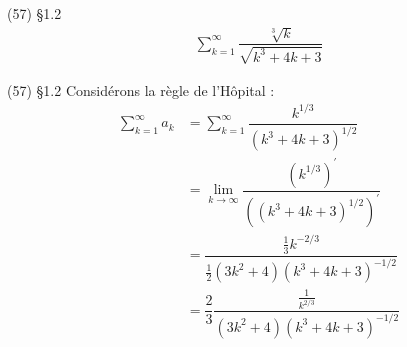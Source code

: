 \documentclass{report}
\begin{document}
\begin{multicols*}{3}
        \begin{Exercice}{(57) \S 1.2}{}
            \begin{align*}
                \sum_{k=1}^{\infty}\dfrac{\sqrt[3]{k}}
                {\sqrt{k^3 + 4k +3}}
            \end{align*} 
        \end{Exercice}


        \begin{Reponse}{(57) \S 1.2}{}
            Considérons la règle de l'Hôpital : 
            \begin{align*}
                 \sum_{k=1}^{\infty}a_k  
                 &=
                 \sum_{k=1}^{\infty}\dfrac{k^{1/3}} 
                 {(k^3 + 4k +3)^{1/2}} \\ 
                 & =
                 \lim\limits_{k\to\infty }\dfrac{(k^{1/3})^{\prime}} 
                 {\left((k^3 + 4k +3)^{1/2}\right)^{\prime}}  
                 \\ 
                 &= \dfrac{\frac{1}{3}k^{-2/3}} 
                 {\frac{1}{2}(3k^2 + 4)(k^3 + 4k +3)^{-1/2}} \\
                 &=
                 \dfrac{2}{3} 
                 \dfrac{\frac{1}{k^{2/3}}}
                 {(3k^2 + 4)(k^3 + 4k +3)^{-1/2}}
            \end{align*}

        \end{Reponse}




        





\end{multicols*}
\end{document}

